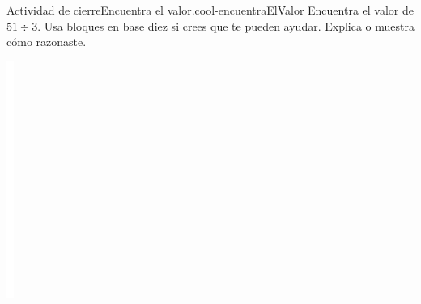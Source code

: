 \documentclass[14pt]{extarticle}
\begin{document}
\begin{project}{Actividad de cierre}{Encuentra el valor.}{cool-encuentraElValor}%
Encuentra el valor de \(51 \div 3.\) Usa bloques en base diez si crees que te pueden ayudar. Explica o muestra cómo razonaste.%
\begin{image}{0}{1}{0}{}%
\includegraphics[max width=\linewidth, center]{external/whitespace-tikz/5cm.pdf}
\end{image}%
\end{project}
\end{document}
